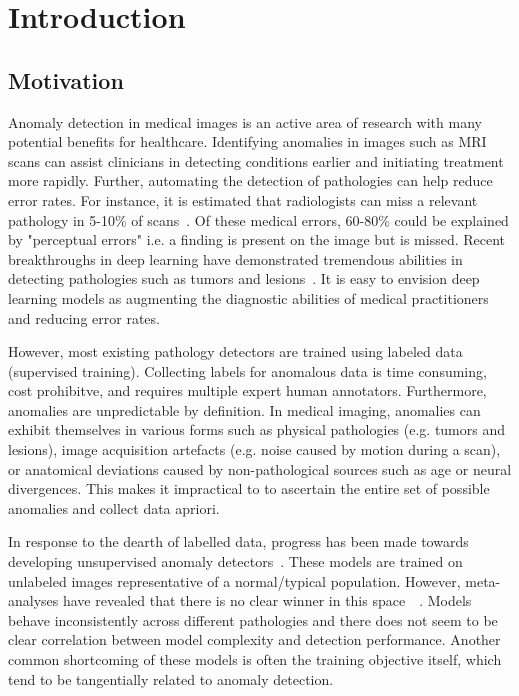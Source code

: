 \chapter{Introduction}

\section{Motivation}

Anomaly detection in medical images is an active area of research with many potential benefits for healthcare. Identifying anomalies in images such as MRI scans can assist clinicians in detecting conditions earlier and initiating treatment more rapidly. Further, automating the detection of pathologies can help reduce error rates. For instance, it is estimated that radiologists can miss a relevant pathology in 5-10\% of scans~\cite{bruno_understanding_2015}. Of these medical errors, 60-80\% could be explained by "perceptual errors" i.e. a finding is present on the image but is missed. Recent breakthroughs in deep learning have demonstrated tremendous abilities in detecting pathologies such as tumors and lesions~\cite{kim_deep_2019,lee_deep_2017}. It is easy to envision deep learning models as augmenting the diagnostic abilities of medical practitioners and reducing error rates.


However, most existing pathology detectors are trained using labeled data (supervised training). Collecting labels for anomalous data is time consuming, cost prohibitve, and requires multiple expert human annotators.  Furthermore, anomalies are unpredictable by definition. In medical imaging, anomalies can exhibit themselves in various forms such as physical pathologies (e.g. tumors and lesions), image acquisition artefacts (e.g. noise caused by motion during a scan), or anatomical deviations caused by non-pathological sources such as age or neural divergences.
This makes it impractical to to ascertain the entire set of possible anomalies and collect data apriori.

In response to the dearth of labelled data, progress has been made towards developing unsupervised anomaly detectors~\cite{tschuchnig_anomaly_2022,baur_deep_2019}. These models are trained on unlabeled images representative of a normal/typical population.
However, meta-analyses have revealed that there is no clear winner in this space~\cite{baur2021}~. Models behave inconsistently across different pathologies and there does not seem to be clear correlation between model complexity and detection performance. Another common shortcoming of these models is often the training objective itself, which tend to be tangentially related to anomaly detection.

